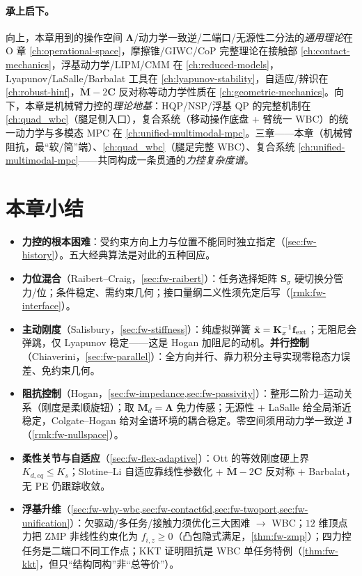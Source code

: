 \paragraph{承上启下。}
向上，本章用到的操作空间 $\boldsymbol{\Lambda}$/动力学一致逆/二端口/无源性二分法的\emph{通用理论}在 O 章 \cref{ch:operational-space}，摩擦锥/GIWC/CoP 完整理论在接触部 \cref{ch:contact-mechanics}，浮基动力学/LIPM/CMM 在 \cref{ch:reduced-models}，Lyapunov/LaSalle/Barbalat 工具在 \cref{ch:lyapunov-stability}，自适应/辨识在 \cref{ch:robust-hinf}，$\dot{\mathbf{M}}-2\mathbf{C}$ 反对称等动力学性质在 \cref{ch:geometric-mechanics}。向下，本章是机械臂力控的\emph{理论地基}：HQP/NSP/浮基 QP 的完整机制在 \cref{ch:quad_wbc}（腿足侧入口），复合系统（移动操作底盘 + 臂统一 WBC）的统一动力学与多模态 MPC 在 \cref{ch:unified-multimodal-mpc}。三章——本章（机械臂阻抗，最“软/简”端）、\cref{ch:quad_wbc}（腿足完整 WBC）、复合系统 \cref{ch:unified-multimodal-mpc}——共同构成一条贯通的\emph{力控复杂度谱}。

\section*{本章小结}

\begin{itemize}
  \item \textbf{力控的根本困难}：受约束方向上力与位置不能同时独立指定（\cref{sec:fw-history}）。五大经典算法是对此的五种回应。
  \item \textbf{力位混合}（Raibert--Craig，\cref{sec:fw-raibert}）：任务选择矩阵 $\mathbf{S}_\sigma$ 硬切换分管力/位；条件稳定、需约束几何；接口量纲二义性须先定后写（\cref{rmk:fw-interface}）。
  \item \textbf{主动刚度}（Salisbury，\cref{sec:fw-stiffness}）：纯虚拟弹簧 $\tilde{\mathbf{x}}=\mathbf{K}_x^{-1}\mathbf{f}_{\rm ext}$；无阻尼会弹跳，仅 Lyapunov 稳定——这是 Hogan 加阻尼的动机。\textbf{并行控制}（Chiaverini，\cref{sec:fw-parallel}）：全方向并行、靠力积分主导实现零稳态力误差、免约束几何。
  \item \textbf{阻抗控制}（Hogan，\cref{sec:fw-impedance,sec:fw-passivity}）：整形二阶力--运动关系（刚度是柔顺旋钮）；取 $\mathbf{M}_d=\boldsymbol{\Lambda}$ 免力传感；无源性 + LaSalle 给全局渐近稳定，Colgate--Hogan 给对全谱环境的耦合稳定。零空间须用动力学一致逆 $\bar{\mathbf{J}}$（\cref{rmk:fw-nullspace}）。
  \item \textbf{柔性关节与自适应}（\cref{sec:fw-flex-adaptive}）：Ott 的等效刚度硬上界 $K_{d,eq}\le K_s$；Slotine--Li 自适应靠线性参数化 + $\dot{\mathbf{M}}-2\mathbf{C}$ 反对称 + Barbalat，无 PE 仍跟踪收敛。
  \item \textbf{浮基升维}（\cref{sec:fw-why-wbc,sec:fw-contact6d,sec:fw-twoport,sec:fw-unification}）：欠驱动/多任务/接触力须优化三大困难 $\to$ WBC；$12$ 维顶点力把 ZMP 非线性约束化为 $f_{i,z}\ge0$（凸包隐式满足，\cref{thm:fw-zmp}）；四力控任务是二端口不同工作点；KKT 证明阻抗是 WBC 单任务特例（\cref{thm:fw-kkt}，但只“结构同构”非“总等价”）。
\end{itemize}

